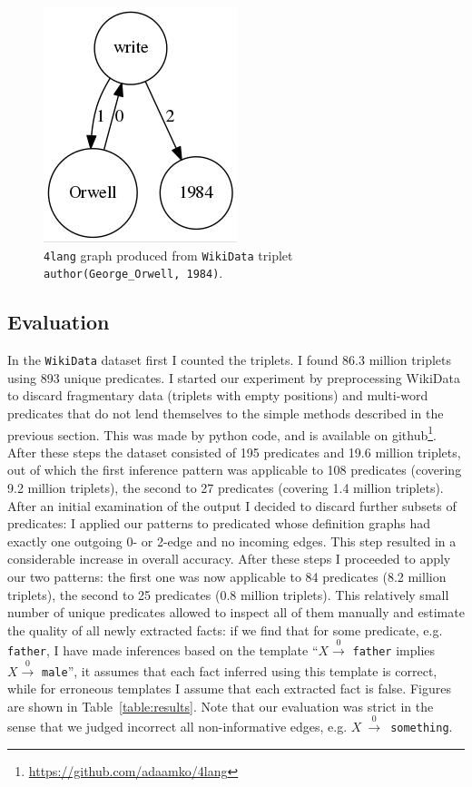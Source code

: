 \begin{figure}
	\centering
	\includegraphics[scale=0.5]{figures/orwell_inf.jpg}
	\caption{\texttt{4lang} graph produced from \texttt{WikiData} triplet
		\texttt{author(George\_Orwell, 1984)}.}
	\label{fig:orwell_inf}
\end{figure}

\subsection{Evaluation}

In the \texttt{WikiData} dataset first I counted the triplets. I found 86.3 million triplets using 893 unique predicates.
I started our experiment by preprocessing WikiData to discard fragmentary data
(triplets with empty positions) and multi-word predicates that do not lend themselves
to the simple methods described in the previous section. This was made by python code, and is available on github\footnote{\url{https://github.com/adaamko/4lang}}.
After these steps the dataset consisted of 195 predicates and 19.6 million triplets,
out of which the first inference pattern was applicable to 108 predicates
(covering 9.2 million triplets), the second to 27 predicates (covering 1.4 million triplets).
After an initial examination of the output I decided to discard further subsets
of predicates: I applied our patterns to predicated whose definition graphs had exactly one outgoing
0- or 2-edge and no incoming edges. This step resulted in a considerable increase in
overall accuracy. After these steps I proceeded to apply our two patterns: the first one was
now applicable to 84 predicates (8.2 million triplets), the second to 25 predicates (0.8 million triplets).
This relatively small number of unique predicates allowed to inspect all of them manually and estimate the quality of all newly
extracted facts: if we find that for some predicate, e.g. \texttt{father}, I
have made inferences based on the template ``$X \xrightarrow0$ \texttt{father}
implies $X \xrightarrow0$ \texttt{male}'', it assumes that each fact inferred
using this template is correct, while for erroneous templates I assume that
each extracted fact is false. Figures are shown in Table~\ref{table:results}.
Note that our evaluation
was strict in the sense that we judged incorrect all non-informative edges, e.g.
$X~\xrightarrow0$~\texttt{something}.

